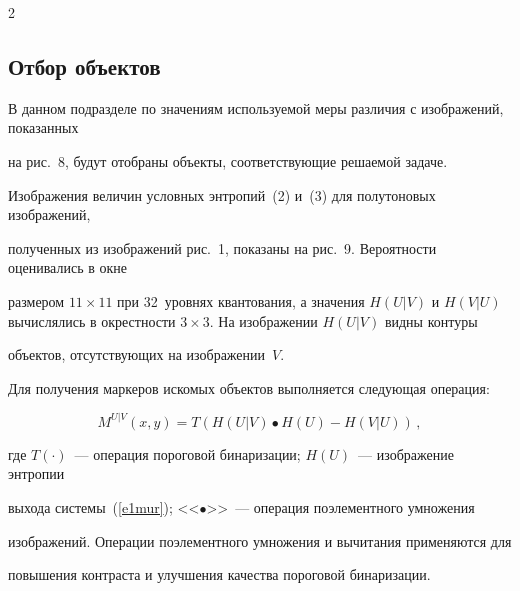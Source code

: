 \begin{multicols}{2}





\subsection{Отбор объектов} %


  


  В данном подразделе по значениям исполь\-зу\-емой меры различия с изображений, показанных 


на рис.~8, будут отобраны объекты, соответст\-ву\-ющие решаемой задаче.


  


  Изображения величин условных энтропий~(2) и~(3) для полутоновых изображений, 


полученных из изображений рис.~1, показаны на рис.~9. Вероятности оценивались в окне 


размером $11\times 11$ при 32~уровнях квантования, а значения $H(U\vert V)$ и $H(V\vert 


U)$ вычислялись в окрестности $3\times 3$. На изображении $H(U\vert V)$ видны контуры 


объектов, отсутствующих на изображении~$V$.





Для получения маркеров искомых объектов выполняется сле\-ду\-ющая операция:





  \pagebreak


  


  


\noindent


  $$


  M^{U\vert V}(x,y) =T\left( H\left( U\vert V\right)\bullet H(U)-H(V\vert U)\right)\,,


  $$


где $T(\cdot)$~--- операция пороговой бинаризации; $H(U)$~--- изображение энтропии 


выхода системы~(\ref{e1mur}); <<$\bullet$>>~--- операция поэлементного умножения 


изображений. Операции поэлементного умножения и вычитания применяются для 


повышения контраста и улучшения качества пороговой бинаризации.



\end{multicols}
